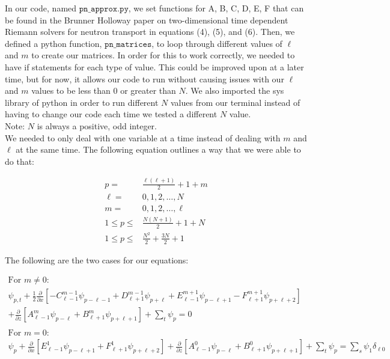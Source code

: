 \documentclass[12pt]{article}
\begin{document}
In our code, named $\texttt{pn\_approx.py}$, we set functions for A, B, C, D, E, F that can be found in the Brunner Holloway paper on two-dimensional time dependent Riemann solvers for neutron transport in equations (4), (5), and (6). Then, we defined a python function, $\texttt{pn\_matrices}$, to loop through different values of $\ell$ and $m$ to create our matrices. In order for this to work correctly, we needed to have if statements for each type of value. This could be improved upon at a later time, but for now, it allows our code to run without causing issues with our $\ell$ and $m$ values to be less than $0$ or greater than $N$. We also imported the sys library of python in order to run different $N$ values from our terminal instead of having to change our code each time we tested a different $N$ value. \\

Note: $N$ is always a positive, odd integer. \\

We needed to only deal with one variable at a time instead of dealing with $m$ and $\ell$ at the same time. The following equation outlines a way that we were able to do that:

\begin{align*}
p = &\frac{\ell(\ell + 1)}{2} + 1 + m \\
\ell = &0, 1, 2, \dots, N \\
m = &0, 1, 2, \dots, \ell \\
1\leq p \leq &\frac{N(N + 1)}{2} + 1 + N \\
1\leq p \leq &\frac{N^2}{2} + \frac{3N}{2} +1
\end{align*}

The following are the two cases for our equations:

\begin{align*}
\text{For } m \neq 0 \text{:} \\
\psi_{p,t} + \frac{1}{2} \frac{\partial}{\partial x} [-C_{\ell - 1}^{m-1} \psi_{p-\ell-1} + D_{\ell + 1}^{m-1} \psi_{p + \ell} + E_{\ell - 1}^{m + 1} \psi_{p- \ell +1} - F_{\ell + 1}^{m+1} \psi_{p + \ell + 2} ] \\ + \frac{\partial}{\partial z} [A_{\ell - 1}^{m} \psi_{p-\ell} + B_{\ell + 1}^{m} \psi_{p+\ell+1}] + \sum_t \psi_p = 0 \\ \\
\text{For } m = 0 \text{:} \\
\psi_p + \frac{\partial}{\partial x}[E_{\ell - 1}^1 \psi_{p-\ell +1} + F_{\ell + 1}^1 \psi_{p+\ell+2}] + \frac{\partial}{\partial z}[A_{\ell - 1}^0 \psi_{p-\ell} + B_{\ell+1}^0 \psi_{p+\ell+1}] + \sum_t \psi_p = \sum_s \psi_1 \delta_{\ell 0}
\end{align*}
\end{document}
